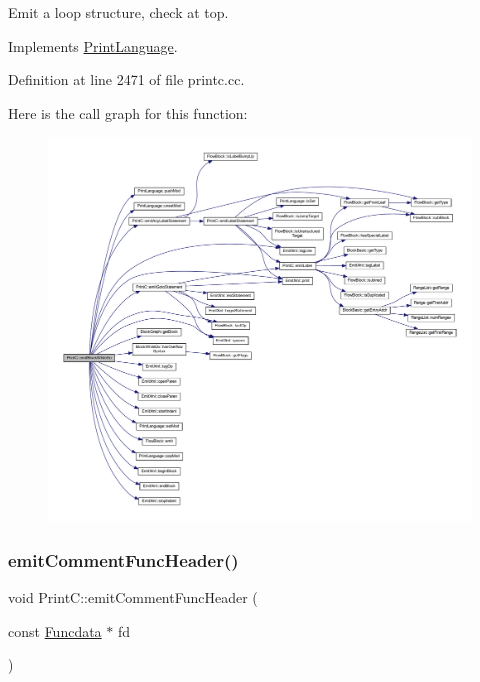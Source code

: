 Emit a loop structure, check at top. 



Implements \mbox{\hyperlink{class_print_language_a642b7bac95ba3e7627f89cbc87ea0dc7}{Print\+Language}}.



Definition at line 2471 of file printc.\+cc.

Here is the call graph for this function\+:
\nopagebreak
\begin{figure}[H]
\begin{center}
\leavevmode
\includegraphics[width=350pt]{class_print_c_ac5165196d7d30a2cb5659af710d17bf3_cgraph}
\end{center}
\end{figure}
\mbox{\label{class_print_c_a1fe6d706578ca30a11d508fba6b1ac2e}} 
\subsubsection{\texorpdfstring{emitCommentFuncHeader()}{emitCommentFuncHeader()}}
{\footnotesize\ttfamily void Print\+C\+::emit\+Comment\+Func\+Header (\begin{DoxyParamCaption}\item[{const \mbox{\hyperlink{class_funcdata}{Funcdata}} $\ast$}]{fd }\end{DoxyParamCaption})\hspace{0.3cm}{\ttfamily [protected]}}



